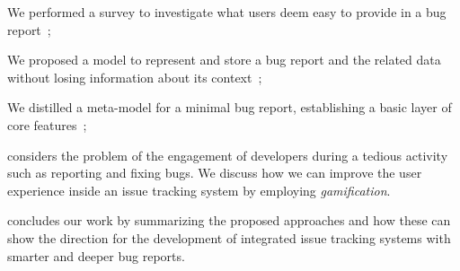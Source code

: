 \begin{description}
  We performed a survey to investigate what users deem easy to provide in a bug report~\cite{DalS2016a};

  We proposed a model to represent and store a bug report and the related data without losing information about its context~\cite{DalS2016a};

  We distilled a meta-model for a minimal bug report, establishing a basic layer of core features~\cite{DalS2016a};


  \item[\chref{ch:gamification}] considers the problem of the engagement of developers during a tedious activity such as reporting and fixing bugs. We discuss how we can improve the user experience inside an issue tracking system by employing \emph{gamification}.

  \item[\chref{ch:conclusion}] concludes our work by summarizing the proposed approaches and how these can show the direction for the development of integrated issue tracking systems with smarter and deeper bug reports.

\end{description}
